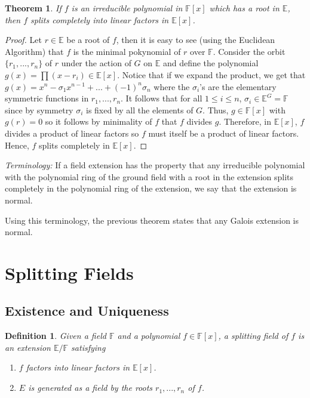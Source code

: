 \documentclass{article}
\newtheorem*{theorem}{Theorem}
\newtheorem*{definition}{Definition}
\newcommand{\F}{\mathbb{F}}
\newcommand{\E}{\mathbb{E}}
\newenvironment{terminology}{\noindent\textit{Terminology:}}{}
\begin{document}
\begin{theorem}
    If $f$ is an irreducible polynomial in $\F[x]$ which has a root in $\E$, then $f$ splits completely into linear factors in $\E[x]$. 
\end{theorem}

\begin{proof}
    Let $r \in \E$ be a root of $f$, then it is easy to see (using the Euclidean Algorithm) that $f$ is the minimal pokynomial of $r$ over $\F$. Consider the orbit $\{r_1, ..., r_n\}$ of $r$ under the action of $G$ on $\E$ and define the polynomial $g(x) = \prod(x - r_i) \in \E[x]$. Notice that if we expand the product, we get that $g(x) = x^n - \sigma_1 x^{n - 1} + ... + (-1)^n \sigma_n$ where the $\sigma_i$'s are the elementary symmetric functions in $r_1, ..., r_n$. It follows that for all $1 \leq i \leq n$, $\sigma_i \in \E^G = \F$ since by symmetry $\sigma_i$ is fixed by all the elements of $G$. Thus, $g \in \F[x]$ with $g(r) = 0$ so it follows by minimality of $f$ that $f$ divides $g$. Therefore, in $\E[x]$, $f$ divides a product of linear factors so $f$ must itself be a product of linear factors. Hence, $f$ splits completely in $\E[x]$. 
\end{proof}

\begin{terminology}
    If a field extension has the property that any irreducible polynomial with the polynomial ring of the ground field with a root in the extension splits completely in the polynomial ring of the extension, we say that the extension is normal. \\
\end{terminology}

Using this terminology, the previous theorem states that any Galois extension is normal.

\section{Splitting Fields}

\subsection{Existence and Uniqueness}

\begin{definition}
    Given a field $\F$ and a polynomial $f \in \F[x]$, a splitting field of $f$ is an extension $\E / \F$ satisfying
    \begin{enumerate}[label=(\alph*)]
        \item $f$ factors into linear factors in $\E[x]$.
        \item $E$ is generated as a field by the roots $r_1, ..., r_n$ of $f$.
    \end{enumerate}
\end{definition}
\end{document}
